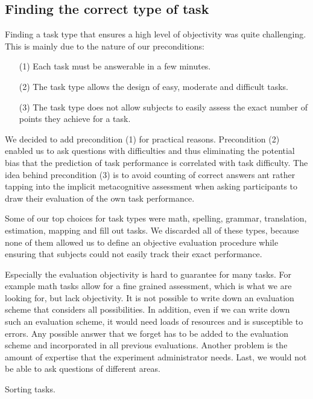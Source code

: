 \documentclass[../main/main.tex]{subfiles}
\begin{document}
	\subsection{Finding the correct type of task}
	\label{sec:finding_task_type}
	
	Finding a task type that ensures a high level of objectivity was quite challenging. This is mainly due to the nature of our preconditions:
	
	\begin{enumerate}
		\item[(1)] Each task must be answerable in a few minutes.
		\item[(2)] The task type allows the design of easy, moderate and difficult tasks.
		\item[(3)] The task type does not allow subjects to easily assess the exact number of points they achieve for a task.
	\end{enumerate}

	\noindent We decided to add precondition (1) for practical reasons. Precondition (2) enabled us to ask questions with difficulties and thus eliminating the potential bias that the prediction of task performance is correlated with task difficulty. The idea behind precondition (3) is to avoid counting of correct answers ant rather tapping into the implicit metacognitive assessment when asking participants to draw their evaluation of the own task performance.

	Some of our top choices for task types were math, spelling, grammar, translation, estimation, mapping and fill out tasks. We discarded all of these types, because none of them allowed us to define an objective evaluation procedure while ensuring that subjects could not easily track their exact performance.
	
	Especially the evaluation objectivity is hard to guarantee for many tasks. For example math tasks allow for a fine grained assessment, which is what we are looking for, but lack objectivity. It is not possible to write down an evaluation scheme that considers all possibilities. In addition, even if we can write down such an evaluation scheme, it would need loads of resources and is susceptible to errors. Any possible answer that we forget has to be added to the evaluation scheme and incorporated in all previous evaluations. Another problem is the amount of expertise that the experiment administrator needs. Last, we would not be able to ask questions of different areas.
	
	Sorting tasks.
	
\end{document}
